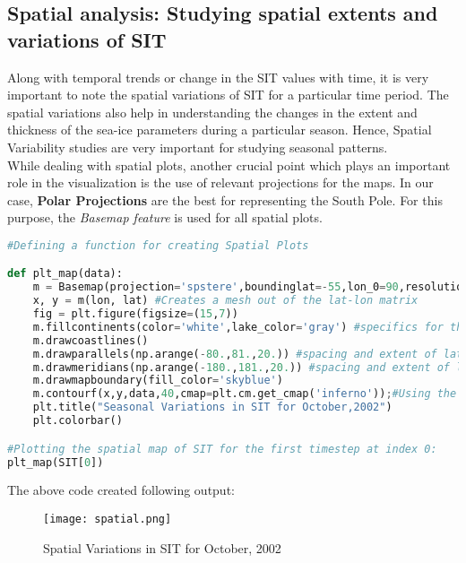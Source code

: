 \documentclass{article} %
\begin{document}
\subsection{Spatial analysis: Studying spatial extents and variations of SIT}

Along with temporal trends or change in the SIT values with time, it is very important to note the spatial variations of SIT for a particular time period. The spatial variations also help in understanding the changes in the extent and thickness of the sea-ice parameters during a particular season. Hence, Spatial Variability studies are very important for studying seasonal patterns. \\
While dealing with spatial plots, another crucial point which plays an important role in the visualization is the use of relevant projections for the maps. In our case, {\bf Polar Projections} are the best for representing the South Pole. For this purpose, the {\it Basemap feature} is used for all spatial plots. \\


\begin{lstlisting}[language=Python, caption= Creating Spatial Plots]
#Defining a function for creating Spatial Plots 

def plt_map(data):
    m = Basemap(projection='spstere',boundinglat=-55,lon_0=90,resolution='l') #Creates a basemap with south pole oriented projection with the domain extending from 55S to 90S.
    x, y = m(lon, lat) #Creates a mesh out of the lat-lon matrix
    fig = plt.figure(figsize=(15,7))
    m.fillcontinents(color='white',lake_color='gray') #specifics for the basemap aesthetic
    m.drawcoastlines()
    m.drawparallels(np.arange(-80.,81.,20.)) #spacing and extent of latitudes
    m.drawmeridians(np.arange(-180.,181.,20.)) #spacing and extent of longitudes
    m.drawmapboundary(fill_color='skyblue')
    m.contourf(x,y,data,40,cmap=plt.cm.get_cmap('inferno'));#Using the fill countor method of plotting 
    plt.title("Seasonal Variations in SIT for October,2002")
    plt.colorbar()

#Plotting the spatial map of SIT for the first timestep at index 0:
plt_map(SIT[0])

\end{lstlisting}

The above code created following output: 

\begin{figure}[h]
    \centering
    \texttt{[image: spatial.png]}%
    \caption{Spatial Variations in SIT for October, 2002}
    \label{fig:spatial} %
\end{figure}
\end{document}
